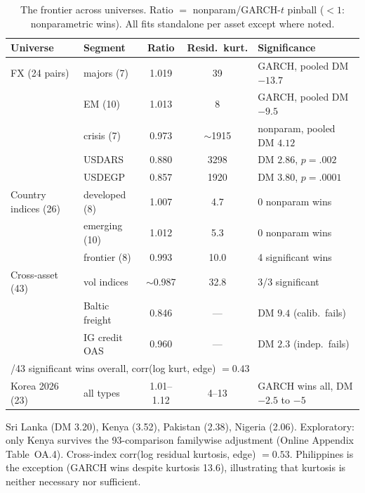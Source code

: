 \documentclass[11pt]{article}
\theoremstyle{remark}
\begin{document}
\begin{table}[t]
\centering
\begin{threeparttable}
\caption{The frontier across universes. Ratio $=$
nonparam/GARCH-$t$ pinball ($<1$: nonparametric wins). All fits
standalone per asset except where noted.}
\label{tab:universes}
\footnotesize\setlength{\tabcolsep}{4pt}
\begin{tabular}{llccl}
\toprule
Universe & Segment & Ratio & Resid.\ kurt. & Significance \\
\midrule
FX (24 pairs) & majors (7) & 1.019 & 39 & GARCH, pooled DM $-13.7$ \\
 & EM (10) & 1.013 & 8 & GARCH, pooled DM $-9.5$ \\
 & crisis (7) & 0.973 & $\sim$1915 & nonparam, pooled DM $4.12$ \\
 & \quad USDARS & 0.880 & 3298 & DM $2.86$, $p=.002$ \\
 & \quad USDEGP & 0.857 & 1920 & DM $3.80$, $p=.0001$ \\
\midrule
Country indices (26) & developed (8) & 1.007 & 4.7 & 0 nonparam wins \\
 & emerging (10) & 1.012 & 5.3 & 0 nonparam wins \\
 & frontier (8) & 0.993 & 10.0 & 4 significant wins\tnote{a} \\
\midrule
Cross-asset (43) & vol indices & $\sim$0.987 & 32.8 & 3/3 significant \\
 & Baltic freight & 0.846 & --- & DM $9.4$ (calib.\ fails) \\
 & IG credit OAS & 0.960 & --- & DM $2.3$ (indep.\ fails) \\
\multicolumn{5}{l}{\quad 13/43 significant wins overall, corr(log kurt, edge) $= 0.43$} \\
\midrule
Korea 2026 (23) & all types & 1.01--1.12 & 4--13 & GARCH wins all, DM $-2.5$ to $-5$ \\
\bottomrule
\end{tabular}
\begin{tablenotes}\footnotesize
\item[a] Sri Lanka (DM 3.20), Kenya (3.52), Pakistan (2.38), Nigeria (2.06). Exploratory: only Kenya survives the 93-comparison
familywise adjustment (Online Appendix Table~OA.4). Cross-index corr(log residual kurtosis, edge) $= 0.53$.
Philippines is the exception (GARCH wins despite kurtosis 13.6),
illustrating that kurtosis is neither necessary nor sufficient.
\end{tablenotes}
\end{threeparttable}
\end{table}
\end{document}
